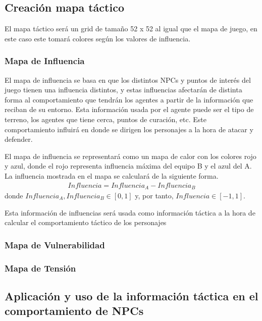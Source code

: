 \subsection{Creación mapa táctico}
El mapa táctico será un grid de tamaño 52 x 52 al igual que el mapa de juego, en este caso este tomará colores según los valores de influencia.



\subsubsection{Mapa de Influencia}
El mapa de influencia se basa en que los distintos NPCs y puntos de interés del juego tienen una influencia distintos, y estas influencias afectarán de distinta forma al comportamiento que tendrán los agentes a partir de la información que reciban de su entorno. Esta información usada por el agente puede ser el tipo de terreno, los agentes que tiene cerca, puntos de curación, etc. Este comportamiento influirá en donde se dirigen los personajes a la hora de atacar y defender. 

El mapa de influencia se representará como un mapa de calor con los colores rojo y azul, donde el rojo representa influencia máxima del equipo B y el azul del A. La influencia mostrada en el mapa se calculará de la siguiente forma.
\begin{gather*}
    Influencia = Influencia_A - Influencia_B
\end{gather*}
donde $Influencia_A, Influencia_B \in [0,1]$ y, por tanto, $Influencia \in [-1, 1]$.


Esta información de influencias será usada como información táctica a la hora de calcular el comportamiento táctico de los personajes
\subsubsection{Mapa de Vulnerabilidad}
\subsubsection{Mapa de Tensión}
\subsection{Aplicación y uso de la información táctica en el comportamiento de NPCs}